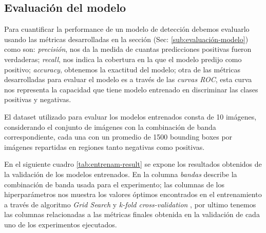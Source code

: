 \subsection*{Evaluación del modelo}\label{sub:evaluacion_class}

Para cuantificar la performance de un modelo de detección debemos evaluarlo usando las métricas desarrolladas en la sección (Sec: \ref{sub:evaluación-modelo}) como son: \textit{precisión}, nos da la medida de cuantas predicciones positivas fueron verdaderas; \textit{recall}, nos indica la cobertura en la que el modelo predijo como positivo; \textit{accuracy}, obtenemos la exactitud del modelo; otra de las métricas desarrolladas para evaluar el modelo es a través de las \textit{curvas ROC}, esta curva nos representa la capacidad que tiene modelo entrenado en discriminar las clases positivas y negativas.

El dataset utilizado para evaluar los modelos entrenados  consta de 10 imágenes, considerando el conjunto de imágenes con la combinación de banda correspondiente, cada una con un promedio de 1500 bounding boxes por imágenes repartidas en regiones tanto negativas como positivas.





En el siguiente cuadro \ref{tab:entrenam-result} se expone los resultados obtenidos de la validación de los modelos entrenados. En la columna \textit{bandas} describe la combinación de banda usada para el experimento; las columnas  de los hiperparámetros nos muestra los valores óptimos encontrados en el entrenamiento a través de algoritmo \textit{Grid Search} y \textit{k-fold cross-validation} , por ultimo tenemos las columnas relacionadas a las métricas finales obtenida en la validación de cada uno de los experimentos ejecutados.

